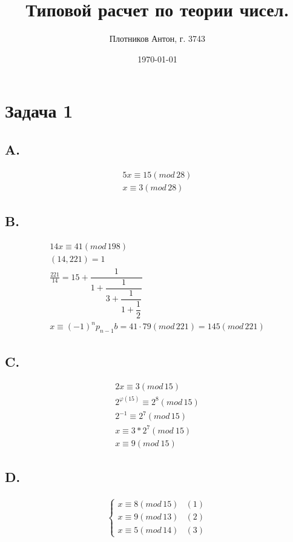 \documentclass[a4paper,12pt]{article}
\author{Плотников Антон, г. 3743}
\title{Типовой расчет по теории чисел.}
\date{\today}
\begin{document}

\maketitle

\section*{Задача 1}
\subsection*{A.}

\begin{gather*}
    5x \equiv 15 (mod\, 28) \\
    x \equiv 3 (mod\, 28)
\end{gather*}


\subsection*{B.}

\begin{gather*}
    14x \equiv 41 (mod\, 198) \\
    (14,221)=1 \\
    \frac{221}{14}=15+\dfrac{1}{1+\dfrac{1}{3+\dfrac{1}{1+\dfrac{1}{2}}}}\\
    x \equiv (-1)^n p_{n-1} b = 41\cdot 79(mod \, 221) = 145(mod\, 221)
\end{gather*}



\subsection*{C.}

\begin{gather*}
    2x \equiv 3 (mod\, 15) \\
    2^{\varphi(15)} \equiv 2^8(mod\, 15) \\
    2^{-1} \equiv 2^7 (mod\, 15) \\
    x \equiv 3*2^7 (mod\ 15) \\
    x \equiv 9 (mod\ 15) 
\end{gather*}

\subsection*{D.}

\begin{gather*}
    \begin{cases}
        x \equiv 8(mod\, 15) &(1)\\
        x \equiv 9(mod\, 13) &(2)\\
        x \equiv 5(mod\, 14) &(3)
    \end{cases}
\end{gather*}
\end{document}

